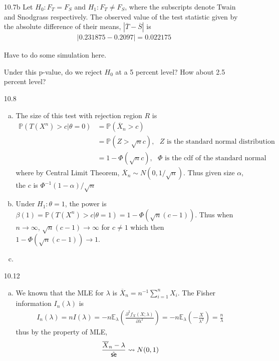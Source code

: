 \documentclass[a4paper,10pt]{article}
\theoremstyle{definition}
\begin{document}
\begin{enumerate}
\item[10.7b] 
Let $H_0: F_T = F_S$ and $H_1: F_T \neq F_S$, where the subscripts denote Twain and Snodgrass respectively. The observed value of the test statistic given by the absolute difference of their means, $|\overline{T} - \overline{S}|$ is 
\begin{align*}
|0.231875 - 0.2097 |=0.022175
\end{align*}
\begin{python}
Have to do some simulation here.
\end{python}
Under this p-value, do we reject $H_0$ at a 5 percent level? How about 2.5 percent level?
\item[10.8]
\begin{enumerate}[(a)]
\item The size of this test with rejection region $R$ is
\begin{align*}
\mathbb{P}(T(X^n)>c| \theta = 0) & = \mathbb{P}(\overline{X}_n > c)\\
& = \mathbb{P}\left(Z > \sqrt{n}c\right), \text{ $Z$ is the standard normal distribution}\\
&= 1- \Phi(\sqrt{n}c), \text{ $\Phi$ is the cdf of the standard normal}
\end{align*}
where by Central Limit Theorem, $\overline{X}_n\sim N(0,1/\sqrt{n})$. Thus given size $\alpha$, the $c$ is $\Phi^{-1}(1-\alpha)/\sqrt{n}$
\item Under $H_1: \theta = 1$, the power is $\beta(1) = \mathbb{P}(T(X^n)>c| \theta = 1) = 1- \Phi\left(\sqrt{n}(c-1)\right)$. Thus when $n \to \infty$, $\sqrt{n}(c-1)\to \infty$ for $c \neq 1$ which then $1- \Phi\left(\sqrt{n}(c-1)\right) \to 1$.
\item 
\end{enumerate}
\item[10.12]
\begin{enumerate}[(a)]
\item We known that the {\sffamily MLE} for $\lambda$ is $\overline{X}_n = n^{-1}\sum_{i=1}^{n}X_i$. The Fisher information $I_n(\lambda)$ is 
\begin{align*}
I_n(\lambda) = nI(\lambda)=-n\mathbb{E}_\lambda\left(\frac{\partial^2 f_X(X;\lambda)}{\partial \lambda^2}\right) = -n\mathbb{E}_\lambda\left(-\frac{X}{\lambda^2}\right)=\frac{n}{\lambda}
\end{align*}
thus by the property of  {\sffamily MLE}, 
\begin{align*}
\frac{\overline{X}_n-\lambda}{\hat{\text{\sffamily se}}} \leadsto N(0,1)
\end{align*}

\end{enumerate}
\end{enumerate}
\end{document}
